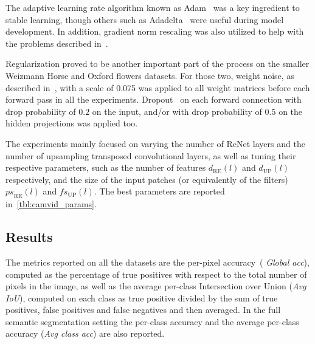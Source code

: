 The adaptive learning rate algorithm known as Adam~\citep{Kingma2014} was a
key ingredient to stable learning, though others such as
Adadelta~\citep{Zeiler-2012} were useful during model development. In addition,
gradient norm rescaling was also utilized to help with the problems described
in~\citep{bengio2013advances}.

Regularization proved to be another important part of the process on the
smaller Weizmann Horse and Oxford flowers datasets. For those two, weight
noise, as described in~\citep{Graves2011}, with a scale of 0.075 was applied to
all weight matrices before each forward pass in all the experiments.
Dropout~\citep{Srivastava14} on each forward connection with drop probability of
$0.2$ on the input, and/or with drop probability of $0.5$ on the hidden
projections was applied too.

The experiments mainly focused on varying the number of ReNet layers and the
number of upsampling transposed convolutional layers, as well as tuning their
respective parameters, such as the number of features $d_{\text{RE}}(l)$ and
$d_{\text{UP}}(l)$ respectively, and the size of the input patches (or
equivalently of the filters) ${ps}_{\text{RE}}(l)$ and ${fs}_{\text{UP}}(l)$.
The best parameters are reported in~\autoref{tbl:camvid_params}.

%


\subsection{Results}\label{sec:reseg_results}

The metrics reported on all the datasets are the per-pixel accuracy~(\emph{%
Global acc}), computed as the percentage of true positives with respect to the
total number of pixels in the image, as well as the average per-class
Intersection over Union (\emph{Avg IoU}), computed on each class as true
positive divided by the sum of true positives, false positives and false
negatives and then averaged. In the full semantic segmentation setting the
per-class accuracy and the average per-class accuracy (\emph{Avg class acc})
are also reported.

